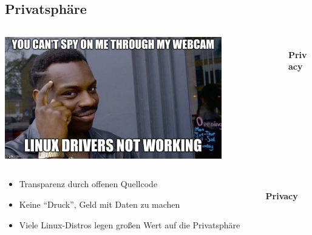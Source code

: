 \documentclass[
    ngerman,
    accentcolor=3b,
    dark_mode,
    fontsize= 12pt,
    a4paper,
    aspectratio=169,
    colorback=true,
    fancy_row_colors,
    leqno,
    fleqn,
    boxarc=3pt,
    fleqn,
]{algoslides}
\begin{document}
    \subsection{Privatsphäre}
    \begin{frame}[c]
        \slidehead{}
        \begin{columns}
            \begin{column}[c]{0.75\textwidth}
                \centering\includegraphics[width=0.8\textwidth]{linux_privacy.jpg}
            \end{column}
            \begin{column}[c]{0.25\textwidth}
                \begin{center}
                    \fontsize{50pt}{0pt}\selectfont\faUserSecret{}\\[0.2cm]
                    \normalsize\textbf{Privacy}
                \end{center}
            \end{column}
        \end{columns}
    \end{frame}
    \begin{frame}[c]
        \slidehead{}
        \begin{columns}
            \begin{column}[c]{0.75\textwidth}
                \begin{itemize}
                    \item Transparenz durch offenen Quellcode
                    \item Keine \enquote{Druck}, Geld mit Daten zu machen
                    \item Viele Linux-Distros legen großen Wert auf die Privatsphäre
                \end{itemize}
            \end{column}
            \begin{column}[c]{0.25\textwidth}
                \begin{center}
                    \fontsize{50pt}{0pt}\selectfont\faUserSecret{}\\[0.2cm]
                    \normalsize\textbf{Privacy}
                \end{center}
            \end{column}
        \end{columns}
    \end{frame}
\end{document}

